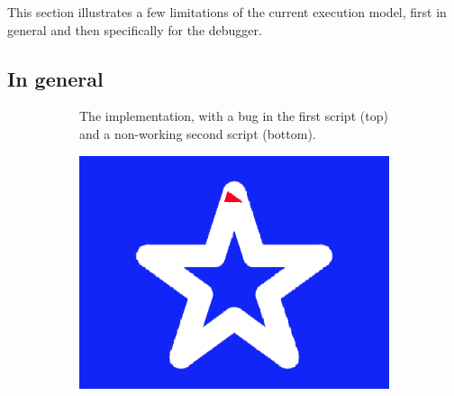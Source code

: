 \documentclass[../main]{subfiles}
\begin{document}
This section illustrates a few limitations of the current execution model, first in general and then specifically for the debugger.

\subsection{In general}\label{subsec:in-general}

\begin{figure}
    \begin{subfigure}[b]{\textwidth}
        \centering
        \begin{scratch}[scale=0.6]
        \end{scratch}
        \hspace{3em}
        \begin{scratch}[scale=0.6]
        \end{scratch}
        \caption{The implementation, with a bug in the first script (top) and a non-working second script (bottom).}
        \label{fig:star-model-implementation}
    \end{subfigure}
    \begin{subfigure}{0.45\textwidth}
        \includegraphics[width=\textwidth]{star-before}

\end{subfigure}
\end{figure}
\end{document}
